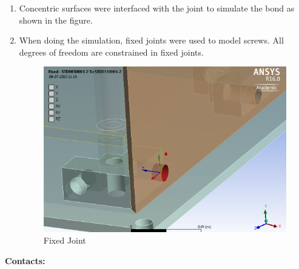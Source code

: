 \documentclass[../../main.tex]{subfiles}
\begin{document}
    \begin{enumerate}
        \item Concentric surfaces were interfaced with the joint to simulate the bond as shown in the figure.
        \item When doing the simulation, fixed joints were used to model screws. All degrees of freedom are constrained in fixed joints. 
      
        \begin{figure}[H]
        \centering
        \includegraphics[scale=0.5]{Figures/Mechanical/fixed.png}
        \caption{Fixed Joint}
        \label{fig:sys_CAD}
    \end{figure}
    \end{enumerate}
    \item \textbf{Contacts: }
\end{document}
